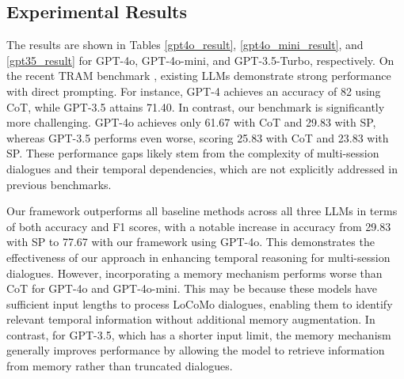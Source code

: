 \subsection{Experimental Results} 
The results are shown in Tables \ref{gpt4o_result}, \ref{gpt4o_mini_result}, and \ref{gpt35_result} for GPT-4o, GPT-4o-mini, and GPT-3.5-Turbo, respectively. On the recent TRAM benchmark \cite{wang-zhao-2024-tram}, existing LLMs demonstrate strong performance with direct prompting. For instance, GPT-4 achieves an accuracy of 82 using CoT, while GPT-3.5 attains 71.40. In contrast, our benchmark is significantly more challenging. GPT-4o achieves only 61.67 with CoT and 29.83 with SP, whereas GPT-3.5 performs even worse, scoring 25.83 with CoT and 23.83 with SP. These performance gaps likely stem from the complexity of multi-session dialogues and their temporal dependencies, which are not explicitly addressed in previous benchmarks.

Our framework outperforms all baseline methods across all three LLMs in terms of both accuracy and F1 scores, with a notable increase in accuracy from 29.83 with SP to 77.67 with our framework using GPT-4o. This demonstrates the effectiveness of our approach in enhancing temporal reasoning for multi-session dialogues. However, incorporating a memory mechanism performs worse than CoT for GPT-4o and GPT-4o-mini. This may be because these models have sufficient input lengths to process LoCoMo dialogues, enabling them to identify relevant temporal information without additional memory augmentation. In contrast, for GPT-3.5, which has a shorter input limit, the memory mechanism generally improves performance by allowing the model to retrieve information from memory rather than truncated dialogues. 


